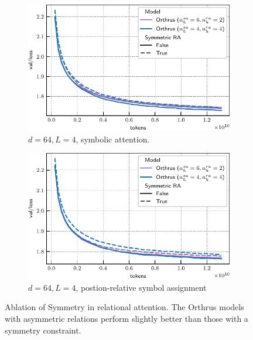\begin{figure}
    \centering
    \begin{subfigure}[t]{0.45\textwidth}
        \centering
        \includegraphics[width=\textwidth]{figs/experiments/tiny_stories/d64L4_ablation_symmetry_symmattn.pdf}
        \caption{$d = 64, L = 4$, symbolic attention.}
    \end{subfigure}
    \hfill
    \begin{subfigure}[t]{0.45\textwidth}
        \centering
        \includegraphics[width=\textwidth]{figs/experiments/tiny_stories/d64L4_ablation_symmetry_posrelsym.pdf}
        \caption{$d = 64, L = 4$, postion-relative symbol assignment}
    \end{subfigure}
    \caption{Ablation of Symmetry in relational attention. The Orthrus models with asymmetric relations perform slightly better than those with a symmetry constraint.}\label{fig:ablation_symmetry}
\end{figure}

